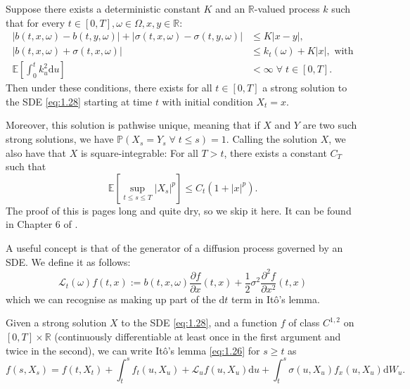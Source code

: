 \begin{theorem}\label{thm:1.6.1}
    Suppose there exists a deterministic constant $K$ and an $\mathbb{R}$-valued process
    $k$ such that for every $t\in[0,T],\omega\in\Omega,x,y\in\mathbb{R}$:
    \begin{align*}
        |b(t,x,\omega)-b(t,y,\omega)|+|\sigma(t,x,\omega)-\sigma(t,y,\omega)|&\leq K|x-y|,\\
        |b(t,x,\omega)+\sigma(t,x,\omega)|&\leq k_t(\omega)+K|x|,\textrm{ with}\\
        \mathbb{E}\left[\int_0^tk_u^2\mathrm du\right]&<\infty\;\forall\;t\in[0,T].
    \end{align*}
    Then under these conditions, there exists for all $t\in[0,T]$ a strong solution 
    to the SDE \eqref{eq:1.28} starting at time $t$ with initial condition $X_t=x$.
    
    Moreover, this solution is pathwise unique, meaning that if $X$ and $Y$ are two
    such strong solutions, we have $\mathbb{P}(X_s=Y_s\;\forall\;t\leq s)=1.$ Calling 
    the solution $X$, we also have that $X$ is square-integrable: For all $T>t$, there 
    exists a constant $C_T$ such that
    \begin{equation*}
        \mathbb{E}\left[\sup_{t\leq s\leq T}|X_s|^p\right]\leq C_t(1+|x|^p).
    \end{equation*}
    The proof of this is pages long and quite dry, so we skip it here. It can be found
    in Chapter 6 of \textcite{Krylov}.
\end{theorem}

\begin{definition}
    A useful concept is that of the generator of a diffusion process governed by 
    an SDE. We define it as follows:
    \begin{equation}\label{eq:1.14}
        \mathcal{L}_t(\omega)f(t,x):=b(t,x,\omega)\frac{\partial f}{\partial x}(t,x)+\frac{1}{2}\sigma^2\frac{\partial^2f}{\partial x^2}(t,x)
    \end{equation}
    which we can recognise as making up part of the $\mathrm dt$ term in It\^{o}'s lemma.
\end{definition}

\begin{theorem}
    Given a strong solution $X$ to the SDE \eqref{eq:1.28}, and a function $f$ of 
    class $C^{1,2}$ on $[0,T]\times\mathbb{R}$ (continuously differentiable at least 
    once in the first argument and twice in the second), we can write It\^{o}'s lemma 
    \eqref{eq:1.26} for $s\geq t$ as 
    \begin{equation}\label{eq:1.30}
        f(s,X_s)=f(t,X_t)+\int_t^sf_t(u,X_u)+\mathcal{L}_uf(u,X_u)\mathrm du + \int_t^s\sigma(u,X_u)f_x(u,X_u)\mathrm dW_u.
    \end{equation}
\end{theorem}


